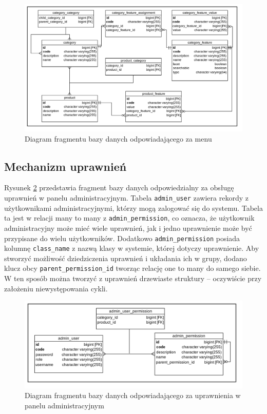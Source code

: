 \begin{figure}
	\begin{center}
		\includegraphics[scale=0.3]{db_sysKlas.png}
	\end{center}
	\caption{{\color{black}Diagram fragmentu bazy danych odpowiadającego za menu}} \label{db_sysKlas}
\end{figure}

\subsection{Mechanizm uprawnień}
Rysunek \ref{db_uprawnienia} przedstawia fragment bazy danych odpowiedzialny za obsługę uprawnień w panelu administracyjnym. Tabela \texttt{admin\_user} zawiera rekordy z użytkownikami administracyjnymi, którzy mogą zalogować się do systemu. Tabela ta jest w relacji many to many z \texttt{admin\_permission}, co oznacza, że użytkownik administracyjny może mieć wiele uprawnień, jak i jedno uprawnienie może być przypisane do wielu użytkowników. Dodatkowo \texttt{admin\_permission} posiada kolumnę \texttt{class\_name} z nazwą klasy w systemie, której dotyczy uprawnienie. Aby stworzyć możliwość dziedziczenia uprawnień i układania ich w grupy, dodano klucz obcy \texttt{parent\_permission\_id} tworząc relację one to many do samego siebie. W ten sposób można tworzyć z uprawnień drzewiaste struktury -- oczywiście przy założeniu niewystępowania cykli. 

\begin{figure}
	\begin{center}
		\includegraphics[scale=0.3]{db_uprawnienia.png}
	\end{center}
	\caption{{\color{black}Diagram fragmentu bazy danych odpowiadającego za uprawnienia w panelu administracyjnym}} \label{db_uprawnienia}
\end{figure}

